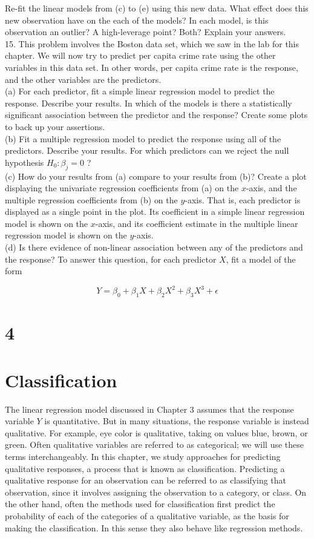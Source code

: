 \documentclass[10pt]{article}
\begin{document}
Re-fit the linear models from (c) to (e) using this new data. What effect does this new observation have on the each of the models? In each model, is this observation an outlier? A high-leverage point? Both? Explain your answers.\\
15. This problem involves the Boston data set, which we saw in the lab for this chapter. We will now try to predict per capita crime rate using the other variables in this data set. In other words, per capita crime rate is the response, and the other variables are the predictors.\\
(a) For each predictor, fit a simple linear regression model to predict the response. Describe your results. In which of the models is there a statistically significant association between the predictor and the response? Create some plots to back up your assertions.\\
(b) Fit a multiple regression model to predict the response using all of the predictors. Describe your results. For which predictors can we reject the null hypothesis $H_{0}: \beta_{j}=0$ ?\\
(c) How do your results from (a) compare to your results from (b)? Create a plot displaying the univariate regression coefficients from (a) on the $x$-axis, and the multiple regression coefficients from (b) on the $y$-axis. That is, each predictor is displayed as a single point in the plot. Its coefficient in a simple linear regression model is shown on the $x$-axis, and its coefficient estimate in the multiple linear regression model is shown on the $y$-axis.\\
(d) Is there evidence of non-linear association between any of the predictors and the response? To answer this question, for each predictor $X$, fit a model of the form

$$
Y=\beta_{0}+\beta_{1} X+\beta_{2} X^{2}+\beta_{3} X^{3}+\epsilon
$$

\section*{4}
\section*{Classification}
The linear regression model discussed in Chapter 3 assumes that the response variable $Y$ is quantitative. But in many situations, the response variable is instead qualitative. For example, eye color is qualitative, taking on values blue, brown, or green. Often qualitative variables are referred to as categorical; we will use these terms interchangeably. In this chapter, we study approaches for predicting qualitative responses, a process that is known as classification. Predicting a qualitative response for an observation can be referred to as classifying that observation, since it involves assigning the observation to a category, or class. On the other hand, often the methods used for classification first predict the probability of each of the categories of a qualitative variable, as the basis for making the classification. In this sense they also behave like regression methods.
\end{document}
